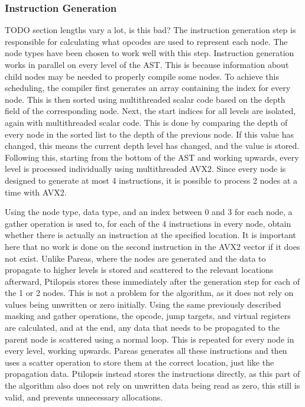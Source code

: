 \documentclass[12pt,dvipsnames]{article}
\newcommand{\helpme}[1]{{\color{red}#1}}
\begin{document}
\subsubsection{Instruction Generation}
\helpme{TODO section lengths vary a lot, is this bad?}
The instruction generation step is responsible for calculating what opcodes are used to represent each node. The node types have been chosen to work well with this step. Instruction generation works in parallel on every level of the AST. This is because information about child nodes may be needed to properly compile some nodes. To achieve this scheduling, the compiler first generates an array containing the index for every node. This is then sorted using multithreaded scalar code based on the depth field of the corresponding node. Next, the start indices for all levels are isolated, again with multithreaded scalar code. This is done by comparing the depth of every node in the sorted list to the depth of the previous node. If this value has changed, this means the current depth level has changed, and the value is stored. Following this, starting from the bottom of the AST and working upwards, every level is processed individually using multithreaded AVX2. Since every node is designed to generate at most 4 instructions, it is possible to process 2 nodes at a time with AVX2.

Using the node type, data type, and an index between 0 and 3 for each node, a gather operation is used to, for each of the 4 instructions in every node, obtain whether there is actually an instruction at the specified location. It is important here that no work is done on the second instruction in the AVX2 vector if it does not exist. Unlike Pareas, where the nodes are generated and the data to propagate to higher levels is stored and scattered to the relevant locations afterward, Ptilopsis stores these immediately after the generation step for each of the 1 or 2 nodes. This is not a problem for the algorithm, as it does not rely on values being unwritten or zero initially. Using the same previously described masking and gather operations, the opcode, jump targets, and virtual registers are calculated, and at the end, any data that needs to be propagated to the parent node is scattered using a normal loop. This is repeated for every node in every level, working upwards. Pareas generates all these instructions and then uses a scatter operation to store them at the correct location, just like the propagation data. Ptilopsis instead stores the instructions directly, as this part of the algorithm also does not rely on unwritten data being read as zero, this still is valid, and prevents unnecessary allocations. 
\end{document}

